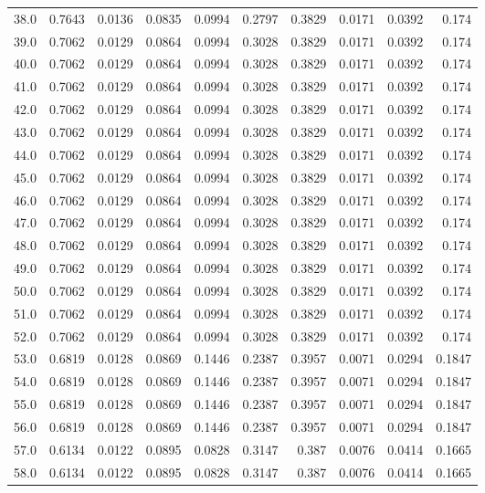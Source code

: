 \begin{longtable}{lrrrrrrrrr}
38.0 & 0.7643 & 0.0136 & 0.0835 & 0.0994 & 0.2797 & 0.3829 & 0.0171 & 0.0392 & 0.174 \\
39.0 & 0.7062 & 0.0129 & 0.0864 & 0.0994 & 0.3028 & 0.3829 & 0.0171 & 0.0392 & 0.174 \\
40.0 & 0.7062 & 0.0129 & 0.0864 & 0.0994 & 0.3028 & 0.3829 & 0.0171 & 0.0392 & 0.174 \\
41.0 & 0.7062 & 0.0129 & 0.0864 & 0.0994 & 0.3028 & 0.3829 & 0.0171 & 0.0392 & 0.174 \\
42.0 & 0.7062 & 0.0129 & 0.0864 & 0.0994 & 0.3028 & 0.3829 & 0.0171 & 0.0392 & 0.174 \\
43.0 & 0.7062 & 0.0129 & 0.0864 & 0.0994 & 0.3028 & 0.3829 & 0.0171 & 0.0392 & 0.174 \\
44.0 & 0.7062 & 0.0129 & 0.0864 & 0.0994 & 0.3028 & 0.3829 & 0.0171 & 0.0392 & 0.174 \\
45.0 & 0.7062 & 0.0129 & 0.0864 & 0.0994 & 0.3028 & 0.3829 & 0.0171 & 0.0392 & 0.174 \\
46.0 & 0.7062 & 0.0129 & 0.0864 & 0.0994 & 0.3028 & 0.3829 & 0.0171 & 0.0392 & 0.174 \\
47.0 & 0.7062 & 0.0129 & 0.0864 & 0.0994 & 0.3028 & 0.3829 & 0.0171 & 0.0392 & 0.174 \\
48.0 & 0.7062 & 0.0129 & 0.0864 & 0.0994 & 0.3028 & 0.3829 & 0.0171 & 0.0392 & 0.174 \\
49.0 & 0.7062 & 0.0129 & 0.0864 & 0.0994 & 0.3028 & 0.3829 & 0.0171 & 0.0392 & 0.174 \\
50.0 & 0.7062 & 0.0129 & 0.0864 & 0.0994 & 0.3028 & 0.3829 & 0.0171 & 0.0392 & 0.174 \\
51.0 & 0.7062 & 0.0129 & 0.0864 & 0.0994 & 0.3028 & 0.3829 & 0.0171 & 0.0392 & 0.174 \\
52.0 & 0.7062 & 0.0129 & 0.0864 & 0.0994 & 0.3028 & 0.3829 & 0.0171 & 0.0392 & 0.174 \\
53.0 & 0.6819 & 0.0128 & 0.0869 & 0.1446 & 0.2387 & 0.3957 & 0.0071 & 0.0294 & 0.1847 \\
54.0 & 0.6819 & 0.0128 & 0.0869 & 0.1446 & 0.2387 & 0.3957 & 0.0071 & 0.0294 & 0.1847 \\
55.0 & 0.6819 & 0.0128 & 0.0869 & 0.1446 & 0.2387 & 0.3957 & 0.0071 & 0.0294 & 0.1847 \\
56.0 & 0.6819 & 0.0128 & 0.0869 & 0.1446 & 0.2387 & 0.3957 & 0.0071 & 0.0294 & 0.1847 \\
57.0 & 0.6134 & 0.0122 & 0.0895 & 0.0828 & 0.3147 & 0.387 & 0.0076 & 0.0414 & 0.1665 \\
58.0 & 0.6134 & 0.0122 & 0.0895 & 0.0828 & 0.3147 & 0.387 & 0.0076 & 0.0414 & 0.1665 \\

\end{longtable}
